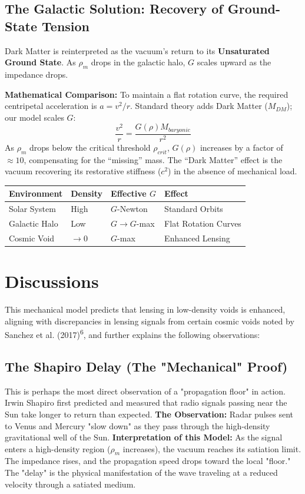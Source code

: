 \documentclass[12pt,a4paper]{article}
\begin{document}
\subsection{The Galactic Solution: Recovery of Ground-State Tension}
Dark Matter is reinterpreted as the vacuum’s return to its \textbf{Unsaturated Ground State}. As $\rho_m$ drops in the galactic halo, $G$ scales upward as the impedance drops.

\textbf{Mathematical Comparison:}
To maintain a flat rotation curve, the required centripetal acceleration is $a = v^2/r$. Standard theory adds Dark Matter ($M_{DM}$); our model scales $G$:
\begin{equation}
\frac{v^2}{r} = \frac{G(\rho) M_{baryonic}}{r^2}
\end{equation}
As $\rho_m$ drops below the critical threshold $\rho_{crit}$, $G(\rho)$ increases by a factor of $\approx 10$, compensating for the ``missing'' mass. The ``Dark Matter'' effect is the vacuum recovering its restorative stiffness ($c^2$) in the absence of mechanical load.


\begin{center}
\begin{tabular}{llll}
\toprule
Environment & Density & Effective $G$ & Effect \\ \midrule
Solar System & High & $G$-Newton & Standard Orbits \\
Galactic Halo & Low & $G \to G$-max & Flat Rotation Curves \\
Cosmic Void & $\to 0$ & $G$-max & Enhanced Lensing \\ \bottomrule
\end{tabular}
\end{center}

\section{Discussions}
This mechanical model predicts that lensing in low-density voids is enhanced, aligning with discrepancies in lensing signals from certain cosmic voids noted by Sanchez et al. (2017)\textsuperscript{6}, and further explains the following observations:

\subsection{The Shapiro Delay (The "Mechanical" Proof)}
This is perhaps the most direct observation of a "propagation floor" in action. Irwin Shapiro first predicted and measured that radio signals passing near the Sun take longer to return than expected.
\textbf{The Observation:} Radar pulses sent to Venus and Mercury "slow down" as they pass through the high-density gravitational well of the Sun.
\textbf{Interpretation of this Model:}
 As the signal enters a high-density region ($\rho_m$ increases), the vacuum reaches its satiation limit. The impedance rises, and the propagation speed drops toward the local "floor." The "delay" is the physical manifestation of the wave traveling at a reduced velocity through a satiated medium.
\end{document}

